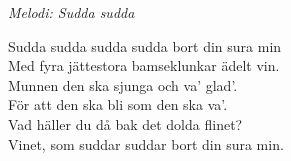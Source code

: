 {\footnotesize\textit{Melodi: Sudda sudda}}\par
\vspace{10pt}
Sudda sudda sudda sudda bort din sura min\\
Med fyra jättestora bamseklunkar ädelt vin.\\
Munnen den ska sjunga och va' glad'.\\
För att den ska bli som den ska va'.\\
Vad häller du då bak det dolda flinet?\\
Vinet, som suddar suddar bort din sura min.
